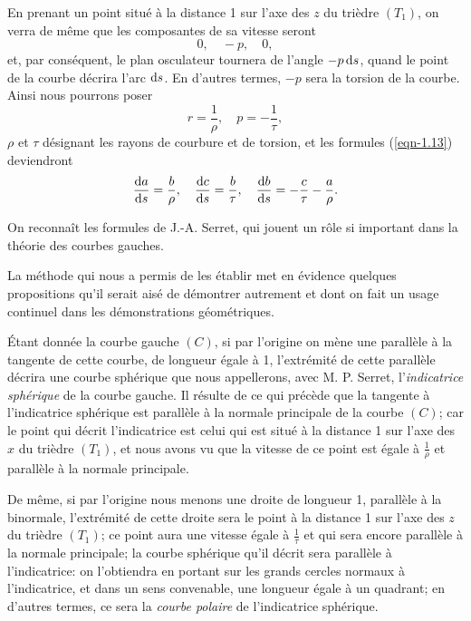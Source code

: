 En prenant un point situé à la distance 1 sur l'axe des $z$ du trièdre $(T_1)$, on verra de même que les composantes de 
sa vitesse seront
\[
	0, \quad -p, \quad 0,
\]
et, par conséquent, le plan osculateur tournera de l'angle $-p \operatorname{d}\!{s}$, quand le point de la courbe décrira l'arc 
$\operatorname{d}\!{s}$. En d'autres termes, $-p$ sera la torsion de la courbe. Ainsi nous pourrons poser
\begin{equation}
	r = \frac{1}{\rho},\quad p = -\frac{1}{\tau},
	\label{eqn-1.14}
\end{equation}
$\rho$ et $\tau$ désignant les rayons de courbure et de torsion, et les formules (\ref{eqn-1.13}) deviendront
\begin{equation}
	\frac{\operatorname{d}\!{a}}{\operatorname{d}\!{s}} = \frac{b}{\rho}, 
	 \quad \frac{\operatorname{d}\!{c}}{\operatorname{d}\!{s}} = \frac{b}{\tau},
	 \quad \frac{\operatorname{d}\!{b}}{\operatorname{d}\!{s}} = - \frac{c}{\tau} - \frac{a}{\rho}.
	\label{eqn-1.15}
\end{equation}

On reconnaît les formules de J.-A. Serret, qui jouent un rôle si important dans la théorie des courbes gauches.

 La méthode qui nous a permis de les établir met en évidence quelques propositions qu'il serait aisé de 
démontrer autrement et dont on fait un usage continuel dans les démonstrations géométriques.

Étant donnée la courbe gauche $(C)$, si par l'origine on mène une parallèle à la tangente de cette courbe, de longueur 
égale à 1, l'extrémité de cette parallèle décrira une courbe sphérique que nous appellerons, avec M. P. Serret, 
l'\textit{indicatrice sphérique} de la courbe gauche. Il résulte de ce qui précède que la tangente à l'indicatrice 
sphérique est parallèle à la normale principale de la courbe $(C)$; car le point qui décrit l'indicatrice est celui qui 
est situé à la distance 1 sur l'axe des $x$ du trièdre $(T_1)$, et nous avons vu que la vitesse de ce point est égale à 
$\frac1\rho$ et parallèle à la normale principale. 

De même, si par l'origine nous menons une droite de longueur 1, parallèle à la binormale, l'extrémité de cette droite 
sera le point à la distance 1 sur l'axe des $z$ du trièdre $(T_1)$; ce point aura une vitesse égale à $\frac1\tau$ et 
qui sera encore parallèle à la normale principale; la courbe sphérique qu'il décrit sera parallèle à l'indicatrice: on 
l'obtiendra en portant sur les grands cercles normaux à l'indicatrice, et dans un sens convenable, une longueur égale à 
un quadrant; en d'autres termes, ce sera la \textit{courbe polaire} de l'indicatrice sphérique.

